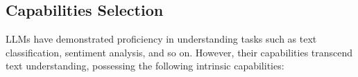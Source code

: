 \subsection{Capabilities Selection}
\label{sec:capability_selection}


LLMs have demonstrated proficiency in understanding tasks such as text classification, sentiment analysis, and so on. 
However, their capabilities transcend text understanding, possessing the following intrinsic capabilities:

